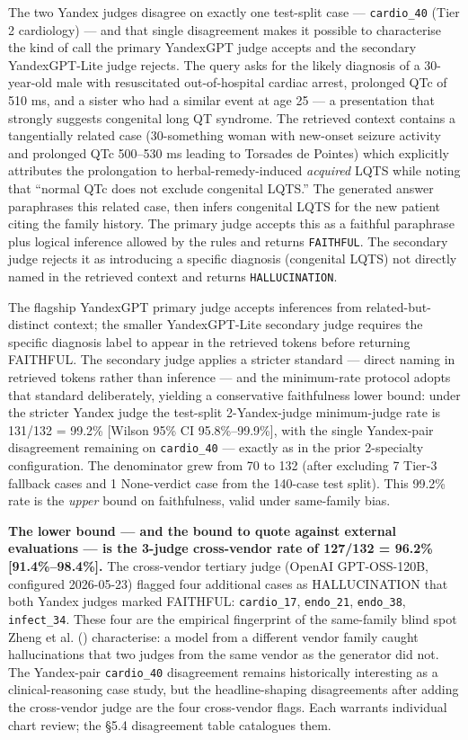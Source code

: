 \documentclass[
  american,
  a4paper,
]{article}
\begin{document}
The two Yandex judges disagree on exactly one test-split case ---
\texttt{cardio\_40} (Tier 2 cardiology) --- and that single disagreement
makes it possible to characterise the kind of call the primary YandexGPT
judge accepts and the secondary YandexGPT-Lite judge rejects. The query
asks for the likely diagnosis of a 30-year-old male with resuscitated
out-of-hospital cardiac arrest, prolonged QTc of 510 ms, and a sister
who had a similar event at age 25 --- a presentation that strongly
suggests congenital long QT syndrome. The retrieved context contains a
tangentially related case (30-something woman with new-onset seizure
activity and prolonged QTc 500--530 ms leading to Torsades de Pointes)
which explicitly attributes the prolongation to herbal-remedy-induced
\emph{acquired} LQTS while noting that ``normal QTc does not exclude
congenital LQTS.'' The generated answer paraphrases this related case,
then infers congenital LQTS for the new patient citing the family
history. The primary judge accepts this as a faithful paraphrase plus
logical inference allowed by the rules and returns \texttt{FAITHFUL}.
The secondary judge rejects it as introducing a specific diagnosis
(congenital LQTS) not directly named in the retrieved context and
returns \texttt{HALLUCINATION}.

The flagship YandexGPT primary judge accepts inferences from
related-but-distinct context; the smaller YandexGPT-Lite secondary judge
requires the specific diagnosis label to appear in the retrieved tokens
before returning FAITHFUL. The secondary judge applies a stricter
standard --- direct naming in retrieved tokens rather than inference ---
and the minimum-rate protocol adopts that standard deliberately,
yielding a conservative faithfulness lower bound: under the stricter
Yandex judge the test-split 2-Yandex-judge minimum-judge rate is 131/132
= 99.2\% {[}Wilson 95\% CI 95.8\%--99.9\%{]}, with the single
Yandex-pair disagreement remaining on \texttt{cardio\_40} --- exactly as
in the prior 2-specialty configuration. The denominator grew from 70 to
132 (after excluding 7 Tier-3 fallback cases and 1 None-verdict case
from the 140-case test split). This 99.2\% rate is the \emph{upper}
bound on faithfulness, valid under same-family bias.

\textbf{The lower bound --- and the bound to quote against external
evaluations --- is the 3-judge cross-vendor rate of 127/132 = 96.2\%
{[}91.4\%--98.4\%{]}.} The cross-vendor tertiary judge (OpenAI
GPT-OSS-120B, configured 2026-05-23) flagged four additional cases as
HALLUCINATION that both Yandex judges marked FAITHFUL:
\texttt{cardio\_17}, \texttt{endo\_21}, \texttt{endo\_38},
\texttt{infect\_34}. These four are the empirical fingerprint of the
same-family blind spot Zheng et al.
() characterise: a model from a
different vendor family caught hallucinations that two judges from the
same vendor as the generator did not. The Yandex-pair
\texttt{cardio\_40} disagreement remains historically interesting as a
clinical-reasoning case study, but the headline-shaping disagreements
after adding the cross-vendor judge are the four cross-vendor flags.
Each warrants individual chart review; the §5.4 disagreement table
catalogues them.
\end{document}
